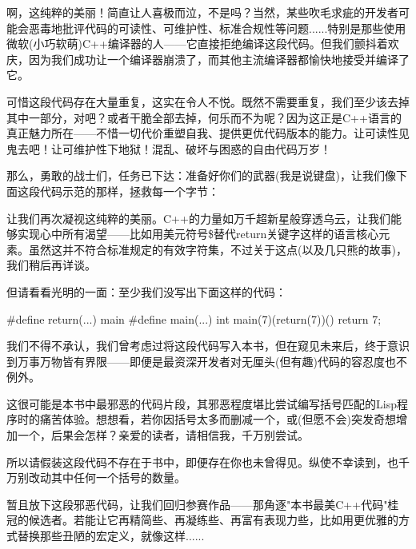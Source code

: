 啊，这纯粹的美丽！简直让人喜极而泣，不是吗？当然，某些吹毛求疵的开发者可能会恶毒地批评代码的可读性、可维护性、标准合规性等问题......特别是那些使用微软(小巧软萌)C++编译器的人——它直接拒绝编译这段代码。但我们颤抖着欢庆，因为我们成功让一个编译器崩溃了，而其他主流编译器都愉快地接受并编译了它。

可惜这段代码存在大量重复，这实在令人不悦。既然不需要重复，我们至少该去掉其中一部分，对吧？或者干脆全部去掉，何乐而不为呢？因为这正是C++语言的真正魅力所在——不惜一切代价重塑自我、提供更优代码版本的能力。让可读性见鬼去吧！让可维护性下地狱！混乱、破坏与困惑的自由代码万岁！

那么，勇敢的战士们，任务已下达：准备好你们的武器(我是说键盘)，让我们像下面这段代码示范的那样，拯救每一个字节：


让我们再次凝视这纯粹的美丽。C++的力量如万千超新星般穿透乌云，让我们能够实现心中所有渴望——比如用美元符号\$替代return关键字这样的语言核心元素。虽然这并不符合标准规定的有效字符集，不过关于这点(以及几只熊的故事)，我们稍后再详谈。

但请看看光明的一面：至少我们没写出下面这样的代码：

\begin{cpp}
#define return(...) main
#define main(...) int
main(7)(return(7))(){
  return 7;
}
\end{cpp}

我们不得不承认，我们曾考虑过将这段代码写入本书，但在窥见未来后，终于意识到万事万物皆有界限——即便是最资深开发者对无厘头(但有趣)代码的容忍度也不例外。

这很可能是本书中最邪恶的代码片段，其邪恶程度堪比尝试编写括号匹配的Lisp程序时的痛苦体验。想想看，若你因括号太多而删减一个，或(但愿不会)突发奇想增加一个，后果会怎样？亲爱的读者，请相信我，千万别尝试。

所以请假装这段代码不存在于书中，即便存在你也未曾得见。纵使不幸读到，也千万别改动其中任何一个括号的数量。

暂且放下这段邪恶代码，让我们回归参赛作品——那角逐"本书最美C++代码"桂冠的候选者。若能让它再精简些、再凝练些、再富有表现力些，比如用更优雅的方式替换那些丑陋的宏定义，就像这样......


